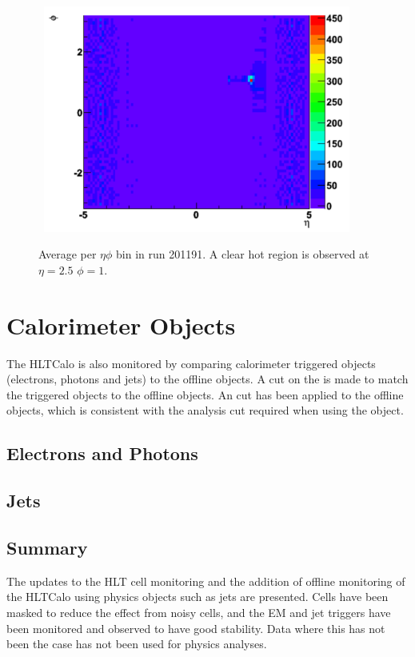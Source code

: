 \begin{figure}
\centering
\mbox{
   \includegraphics[width=0.9\textwidth]{figures/ServiceWork/Cells_HotSpot.pdf}
}
\caption[Average \et{} for HLT calorimeter cells]{
Average \et{} per $\eta \phi$ bin in run 201191. 
A clear hot region is observed at $\eta=2.5$ $\phi=1$. 
\label{SW_hotspot}}
\end{figure}



\section{Calorimeter Objects}

The HLTCalo is also monitored by comparing calorimeter triggered objects (electrons, photons and jets) to the offline objects.
A cut on the \dr{} is made to match the triggered objects to the offline objects.
An \et{} cut has been applied to the offline objects, which is consistent with the analysis cut required when using the object. 



\subsection{Electrons and Photons}




 
\subsection{Jets}
\label{HLTCalo:Jets}




\subsection{Summary}

The updates to the HLT cell monitoring and the addition of offline monitoring of the HLTCalo using physics objects such as jets are presented.
Cells have been masked to reduce the effect from noisy cells, and the EM and jet triggers have been monitored and observed to have good stability. 
Data where this has not been the case has not been used for physics analyses.
